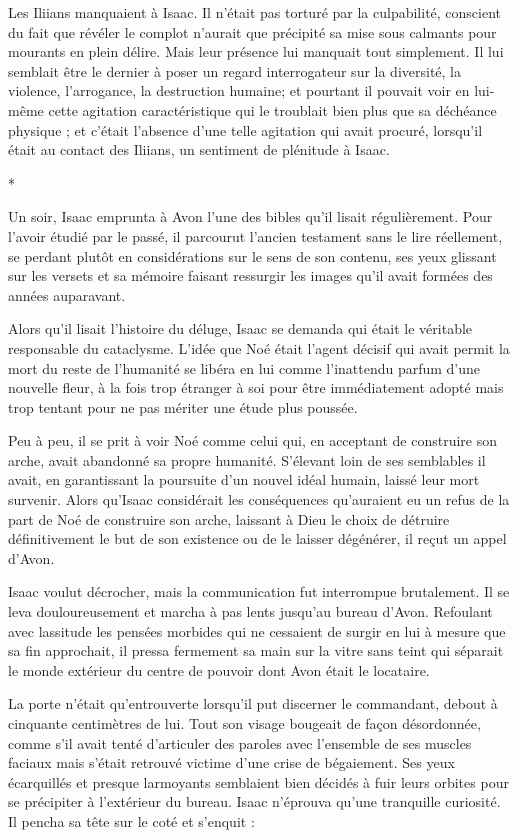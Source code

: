 \documentclass[12pt]{book}
\newcommand{\s}{\begin{center}
*
\end{center}
}
\begin{document}
Les Iliians manquaient à Isaac. Il n'était pas torturé par la culpabilité, conscient du fait que révéler le complot n'aurait que précipité sa mise sous calmants pour mourants en plein délire. Mais leur présence lui manquait tout simplement. Il lui semblait être le dernier à poser un regard interrogateur sur la diversité, la violence, l'arrogance, la destruction humaine; et pourtant il pouvait voir en lui-même cette agitation caractéristique qui le troublait bien plus que sa déchéance physique ; et c'était l'absence d'une telle agitation qui avait procuré, lorsqu'il était au contact des Iliians, un sentiment de plénitude à Isaac.

\s

Un soir, Isaac emprunta à Avon l'une des bibles qu'il lisait régulièrement. Pour l'avoir étudié par le passé, il parcourut l'ancien testament sans le lire réellement, se perdant plutôt en considérations sur le sens de son contenu, ses yeux glissant sur les versets et sa mémoire faisant ressurgir les images qu'il avait formées des années auparavant.


Alors qu'il lisait l'histoire du déluge, Isaac se demanda qui était le véritable responsable du cataclysme. L'idée que Noé était l'agent décisif qui avait permit la mort du reste de l'humanité se libéra en lui comme l'inattendu parfum d'une nouvelle fleur, à la fois trop étranger à soi pour être immédiatement adopté mais trop tentant pour ne pas mériter une étude plus poussée.


Peu à peu, il se prit à voir Noé comme celui qui, en acceptant de construire son arche, avait abandonné sa propre humanité. S'élevant loin de ses semblables il avait, en garantissant la poursuite d'un nouvel idéal humain, laissé leur mort survenir. Alors qu'Isaac considérait les conséquences qu'auraient eu un refus de la part de Noé de construire son arche, laissant à Dieu le choix de détruire définitivement le but de son existence ou de le laisser dégénérer, il reçut un appel d'Avon.


Isaac voulut décrocher, mais la communication fut interrompue brutalement. Il se leva douloureusement et marcha à pas lents jusqu'au bureau d'Avon. Refoulant avec lassitude les pensées morbides qui ne cessaient de surgir en lui à mesure que sa fin approchait, il pressa fermement sa main sur la vitre sans teint qui séparait le monde extérieur du centre de pouvoir dont Avon était le locataire.


La porte n'était qu'entrouverte lorsqu'il put discerner le commandant, debout à cinquante centimètres de lui. Tout son visage bougeait de façon désordonnée, comme s'il avait tenté d'articuler des paroles avec l'ensemble de ses muscles faciaux mais s'était retrouvé victime d'une crise de bégaiement. Ses yeux écarquillés et presque larmoyants semblaient bien décidés à fuir leurs orbites pour se précipiter à l'extérieur du bureau. Isaac n'éprouva qu'une tranquille curiosité. Il pencha sa tête sur le coté et s'enquit :
\end{document}
